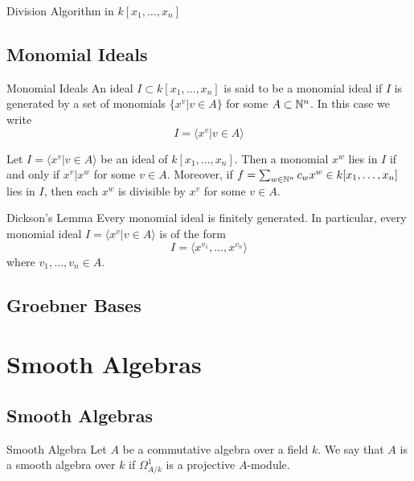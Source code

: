 \documentclass[a4paper]{article}
\begin{document}
\begin{prp}{Division Algorithm in $k[x_1,\dots,x_n]$}{}
\end{prp}

\subsection{Monomial Ideals}
\begin{defn}{Monomial Ideals}{} An ideal $I\subset k[x_1,\dots,x_n]$ is said to be a monomial ideal if $I$ is generated by a set of monomials $\{x^v|v\in A\}$ for some $A\subset\mathbb{N}^n$. In this case we write $$I=\langle x^v|v\in A\rangle$$
\end{defn}

\begin{lmm}{}{} Let $I=\langle x^v|v\in A\rangle$ be an ideal of $k[x_1,\dots,x_n]$. Then a monomial $x^w$ lies in $I$ if and only if $x^v|x^w$ for some $v\in A$. Moreover, if $f=\sum_{w\in\mathbb{N}^n}c_wx^w\in k[x_1,\dots,x_n]$ lies in $I$, then each $x^w$ is divisible by $x^v$ for some $v\in A$. 
\end{lmm}

\begin{thm}{Dickson's Lemma}{} Every monomial ideal is finitely generated. In particular, every monomial ideal $I=\langle x^v|v\in A\rangle$ is of the form $$I=\langle x^{v_1},\dots,x^{v_n}\rangle$$ where $v_1,\dots,v_n\in A$. 
\end{thm}

\subsection{Groebner Bases}

\pagebreak
\section{Smooth Algebras}
\subsection{Smooth Algebras}
\begin{defn}{Smooth Algebra}{} Let $A$ be a commutative algebra over a field $k$. We say that $A$ is a smooth algebra over $k$ if $\Omega_{A/k}^1$ is a projective $A$-module. 
\end{defn}
\end{document}
